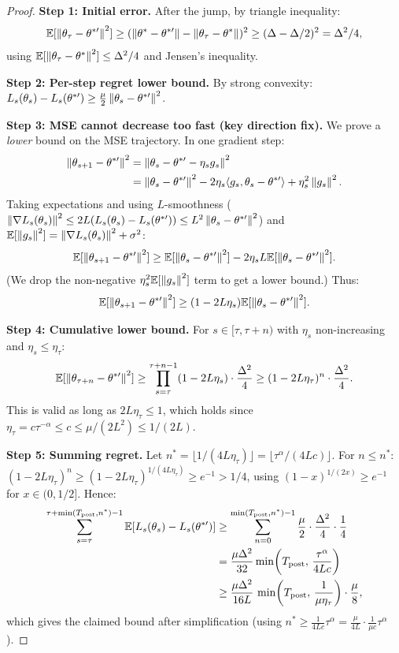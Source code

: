 \begin{proof}
\textbf{Step 1: Initial error.}
After the jump, by triangle inequality:
\[
  \mathbb{E}[\left\|\theta_\tau - \theta^{*\prime}\right\|^2]
  \geq (\left\|\theta^* - \theta^{*\prime}\right\|
  - \left\|\theta_\tau - \theta^*\right\|)^2
  \geq (\Delta - \Delta/2)^2 = \Delta^2/4,
\]
using $\mathbb{E}[\left\|\theta_\tau - \theta^*\right\|^2] \leq \Delta^2/4$ and
Jensen's inequality.

\textbf{Step 2: Per-step regret lower bound.}
By strong convexity:
$L_s(\theta_s) - L_s(\theta^{*\prime}) \geq
\frac{\mu}{2}\left\|\theta_s - \theta^{*\prime}\right\|^2$.

\textbf{Step 3: MSE cannot decrease too fast (key direction fix).}
We prove a \emph{lower} bound on the MSE trajectory.
In one gradient step:
\begin{align*}
  \left\|\theta_{s+1} - \theta^{*\prime}\right\|^2
  &= \left\|\theta_s - \theta^{*\prime} - \eta_s g_s\right\|^2 \\
  &= \left\|\theta_s - \theta^{*\prime}\right\|^2
    - 2\eta_s \langle g_s, \theta_s - \theta^{*\prime} \rangle
    + \eta_s^2\left\|g_s\right\|^2.
\end{align*}
Taking expectations and using $L$-smoothness
($\left\|\nabla L_s(\theta_s)\right\|^2 \leq 2L(L_s(\theta_s)-L_s(\theta^{*\prime}))
\leq L^2\left\|\theta_s-\theta^{*\prime}\right\|^2$) and
$\mathbb{E}[\left\|g_s\right\|^2] = \left\|\nabla L_s(\theta_s)\right\|^2 + \sigma^2$:
\[
  \mathbb{E}[\left\|\theta_{s+1} - \theta^{*\prime}\right\|^2]
  \geq \mathbb{E}[\left\|\theta_s - \theta^{*\prime}\right\|^2]
    - 2\eta_s L \mathbb{E}[\left\|\theta_s - \theta^{*\prime}\right\|^2].
\]
(We drop the non-negative $\eta_s^2\mathbb{E}[\left\|g_s\right\|^2]$ term to get
a lower bound.) Thus:
\[
  \mathbb{E}[\left\|\theta_{s+1}-\theta^{*\prime}\right\|^2]
  \geq (1 - 2L\eta_s)\mathbb{E}[\left\|\theta_s-\theta^{*\prime}\right\|^2].
\]

\textbf{Step 4: Cumulative lower bound.}
For $s \in [\tau, \tau+n)$ with $\eta_s$ non-increasing and
$\eta_s \leq \eta_\tau$:
\[
  \mathbb{E}[\left\|\theta_{\tau+n}-\theta^{*\prime}\right\|^2]
  \geq \prod_{s=\tau}^{\tau+n-1}(1-2L\eta_s)
  \cdot \frac{\Delta^2}{4}
  \geq (1-2L\eta_\tau)^n \cdot \frac{\Delta^2}{4}.
\]
This is valid as long as $2L\eta_\tau \leq 1$, which holds since
$\eta_\tau = c\tau^{-\alpha} \leq c \leq \mu/(2L^2) \leq 1/(2L)$.

\textbf{Step 5: Summing regret.}
Let $n^* = \lfloor 1/(4L\eta_\tau)\rfloor =
\lfloor \tau^\alpha/(4Lc)\rfloor$. For $n \leq n^*$:
$(1-2L\eta_\tau)^n \geq (1-2L\eta_\tau)^{1/(4L\eta_\tau)}
\geq e^{-1} > 1/4$,
using $(1-x)^{1/(2x)} \geq e^{-1}$ for $x \in (0,1/2]$.
Hence:
\begin{align*}
  \sum_{s=\tau}^{\tau+\min(T_{\mathrm{post}}, n^*)-1}
  \mathbb{E}[L_s(\theta_s) - L_s(\theta^{*\prime})]
  &\geq \sum_{n=0}^{\min(T_{\mathrm{post}}, n^*)-1}
    \frac{\mu}{2}\cdot\frac{\Delta^2}{4}\cdot\frac{1}{4} \\
  &= \frac{\mu\Delta^2}{32}\min\!\left(T_{\mathrm{post}},\,
    \frac{\tau^\alpha}{4Lc}\right) \\
  &\geq \frac{\mu\Delta^2}{16L}\,
    \min\!\left(T_{\mathrm{post}},\,
    \frac{1}{\mu\eta_\tau}\right) \cdot \frac{\mu}{8},
\end{align*}
which gives the claimed bound after simplification
(using $n^* \geq \frac{1}{4Lc}\tau^\alpha
= \frac{\mu}{4L}\cdot\frac{1}{\mu c}\tau^\alpha$).
\end{proof}

